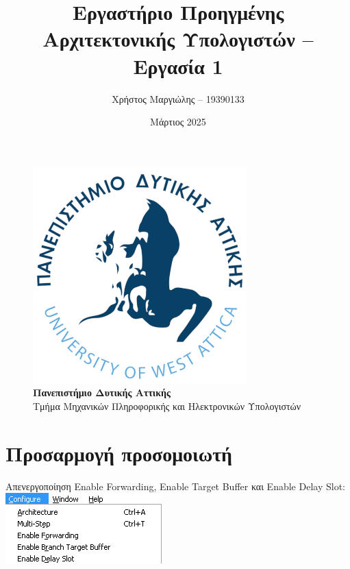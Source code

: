 \documentclass[12pt]{article}
\title{Εργαστήριο Προηγμένης Αρχιτεκτονικής Υπολογιστών -- Εργασία 1}
\author{Χρήστος Μαργιώλης -- 19390133}
\date{Μάρτιος 2025}
\begin{document}
\begin{titlepage}
        \maketitle
        \begin{figure}[t!]
        \begin{center}
        \includegraphics[scale=0.3]{./res/uniwalogo.png} \\
        \Large
        \textbf{Πανεπιστήμιο Δυτικής Αττικής} \\
        \large
        Τμήμα Μηχανικών Πληροφορικής και Ηλεκτρονικών Υπολογιστών
        \end{center}
        \end{figure}
\end{titlepage}

\renewcommand{\contentsname}{Περιεχόμενα}
\tableofcontents
\pagebreak

\section{Προσαρμογή προσομοιωτή}

Απενεργοποίηση Enable Forwarding, Enable Target Buffer και Enable Delay Slot:
\\

\includegraphics{res/disable.png} \\
\end{document}
